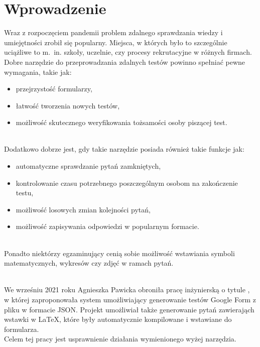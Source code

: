 \chapter{Wprowadzenie}%

Wraz z rozpoczęciem pandemii problem zdalnego sprawdzania wiedzy i umiejętności
 zrobił się popularny. Miejsca, w których było to szczególnie uciążliwe to m.~in. szkoły, 
uczelnie, czy procesy rekrutacyjne w różnych firmach. Dobre narzędzie do przeprowadzania zdalnych
testów powinno spełniać pewne wymagania, takie jak:
\begin{itemize}
  \item przejrzystość formularzy,
  \item łatwość tworzenia nowych testów,
  \item możliwość skutecznego weryfikowania tożsamości osoby piszącej test.
\end{itemize}
\\Dodatkowo dobrze jest, gdy takie narzędzie posiada również takie funkcje jak:
\begin{itemize}
  \item automatyczne sprawdzanie pytań zamkniętych,
  \item kontrolowanie czasu potrzebnego poszczególnym osobom na zakończenie testu,
  \item możliwość losowych zmian kolejności pytań,
  \item możliwość zapisywania odpowiedzi w popularnym formacie.
\end{itemize}
\\Ponadto niektórzy egzaminujący cenią sobie możliwość wstawiania symboli matematycznych, 
wykresów czy zdjęć w ramach pytań.

\\ We wrześniu 2021 roku Agnieszka Pawicka obroniła pracę inżynierską o tytule \ap, 
 w której zaproponowała system umożliwiający generowanie testów Google Form z pliku 
 w formacie JSON. Projekt umożliwiał także generowanie pytań zawierająch wstawki w \LaTeX, 
 które były automatycznie kompilowane i wstawiane do formularza.
 \\ Celem tej pracy jest usprawnienie działania wymienionego wyżej narzędzia.

